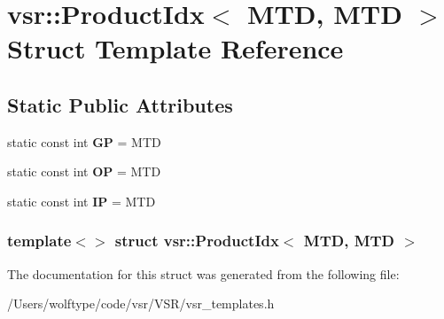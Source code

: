\hypertarget{structvsr_1_1_product_idx_3_01_m_t_d_00_01_m_t_d_01_4}{\section{vsr\-:\-:Product\-Idx$<$ M\-T\-D, M\-T\-D $>$ Struct Template Reference}
\label{structvsr_1_1_product_idx_3_01_m_t_d_00_01_m_t_d_01_4}
}
\subsection*{Static Public Attributes}
\begin{DoxyCompactItemize}
\item 
\hypertarget{structvsr_1_1_product_idx_3_01_m_t_d_00_01_m_t_d_01_4_ae2735c9ea93eabd4764ee6ea7204f0e7}{static const int {\bfseries G\-P} = M\-T\-D}\label{structvsr_1_1_product_idx_3_01_m_t_d_00_01_m_t_d_01_4_ae2735c9ea93eabd4764ee6ea7204f0e7}

\item 
\hypertarget{structvsr_1_1_product_idx_3_01_m_t_d_00_01_m_t_d_01_4_aa5987c347d05476caee7458dc6990834}{static const int {\bfseries O\-P} = M\-T\-D}\label{structvsr_1_1_product_idx_3_01_m_t_d_00_01_m_t_d_01_4_aa5987c347d05476caee7458dc6990834}

\item 
\hypertarget{structvsr_1_1_product_idx_3_01_m_t_d_00_01_m_t_d_01_4_a1430f8bbe82b196f2fa71a2d066b4722}{static const int {\bfseries I\-P} = M\-T\-D}\label{structvsr_1_1_product_idx_3_01_m_t_d_00_01_m_t_d_01_4_a1430f8bbe82b196f2fa71a2d066b4722}

\end{DoxyCompactItemize}
\subsubsection*{template$<$$>$ struct vsr\-::\-Product\-Idx$<$ M\-T\-D, M\-T\-D $>$}



The documentation for this struct was generated from the following file\-:\begin{DoxyCompactItemize}
\item 
/\-Users/wolftype/code/vsr/\-V\-S\-R/vsr\-\_\-templates.\-h\end{DoxyCompactItemize}
